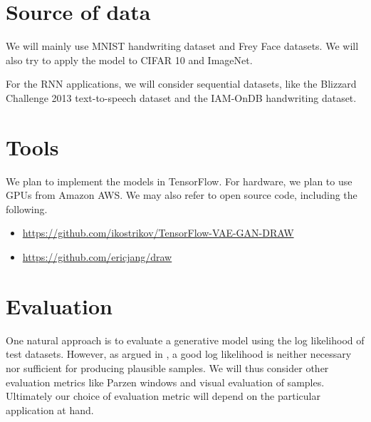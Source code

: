 \documentclass[11pt]{article}
\begin{document}
\section*{Source of data}
We will mainly use MNIST handwriting dataset and Frey Face datasets. We will also try to apply the model to CIFAR 10 and ImageNet.

For the RNN applications, we will consider sequential datasets, like the Blizzard Challenge 2013 text-to-speech dataset and the IAM-OnDB handwriting dataset.

\section*{Tools}
We plan to implement the models in {TensorFlow}.
For hardware, we plan to use GPUs from {Amazon AWS}.
We may also refer to open source code, including the following.
\begin{itemize}
\item \url{https://github.com/ikostrikov/TensorFlow-VAE-GAN-DRAW}
\item \url{https://github.com/ericjang/draw}
\end{itemize}

\section*{Evaluation}

One natural approach is to evaluate a generative model using the log likelihood of test datasets.
However, as argued in \cite{theis2015note}, a good log likelihood is neither necessary nor sufficient for producing plausible samples. We will thus consider other evaluation metrics like Parzen windows and visual evaluation of samples. Ultimately our choice of evaluation metric will depend on the particular application at hand.




\nocite{*}
\end{document}
